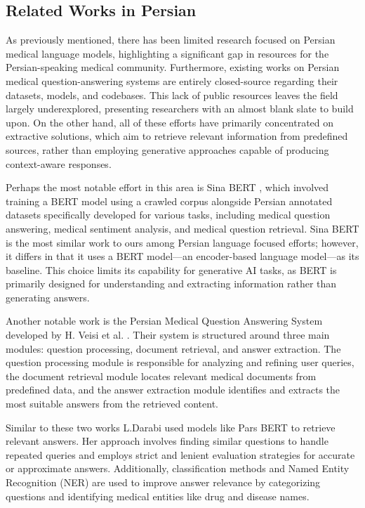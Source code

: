 \documentclass[conference]{IEEEtran}
\begin{document}
	\subsection{Related Works in Persian}
	As previously mentioned, there has been limited research focused on Persian medical language models, highlighting a significant gap in resources for the Persian-speaking medical community. Furthermore, existing works on Persian medical question-answering systems are entirely closed-source regarding their datasets, models, and codebases. This lack of public resources leaves the field largely underexplored, presenting researchers with an almost blank slate to build upon. On the other hand, all of these efforts have primarily concentrated on extractive solutions, which aim to retrieve relevant information from predefined sources, rather than employing generative approaches capable of producing context-aware responses.
	
	Perhaps the most notable effort in this area is Sina BERT \cite{b4}, which involved training a BERT model using a crawled corpus alongside Persian annotated datasets specifically developed for various tasks, including medical question answering, medical sentiment analysis, and medical question retrieval. Sina BERT is the most similar work to ours among Persian language focused efforts; however, it differs in that it uses a BERT model—an encoder-based language model—as its baseline. This choice limits its capability for generative AI tasks, as BERT is primarily designed for understanding and extracting information rather than generating answers.
	
	Another notable work is the Persian Medical Question Answering System developed by H. Veisi et al.
	\cite{b11}.
	Their system is structured around three main modules: question processing, document retrieval, and answer extraction. The question processing module is responsible for analyzing and refining user queries, the document retrieval module locates relevant medical documents from predefined data, and the answer extraction module identifies and extracts the most suitable answers from the retrieved content.
	
	Similar to these two works L.Darabi
	\cite{b12}
	used models like Pars BERT
	\cite{b13}
	to retrieve relevant answers. Her approach involves finding similar questions to handle repeated queries and employs strict and lenient evaluation strategies for accurate or approximate answers. Additionally, classification methods and Named Entity Recognition (NER) are used to improve answer relevance by categorizing questions and identifying medical entities like drug and disease names.
	
\end{document}
